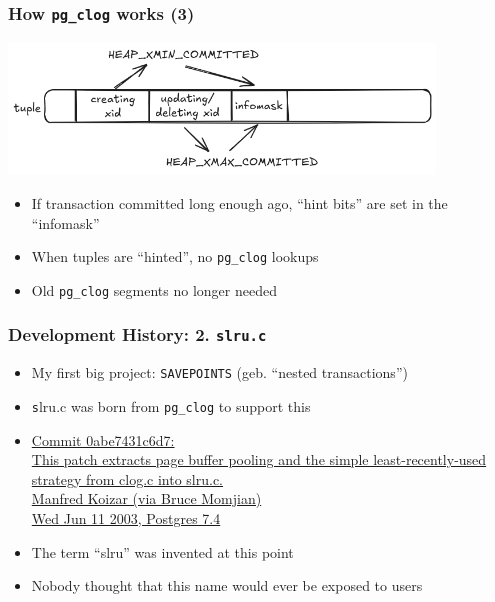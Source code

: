 \begin{frame}
  \frametitle{How \texttt{pg\_clog} works (3)}
  \includegraphics[width=0.85\textwidth]{tuple-hinted.png}
  \begin{itemize}
    \item If transaction committed long enough ago, ``hint bits'' are set
      in the ``infomask''
    \item When tuples are ``hinted'', no \texttt{pg\_clog} lookups 
    \item Old \texttt{pg\_clog} segments no longer needed
  \end{itemize}
\end{frame}

\begin{frame}
  \frametitle{Development History: 2. \texttt{slru.c}}
  \begin{itemize}
    \item My first big project: \texttt{SAVEPOINTS} (geb. ``nested transactions'')
    \item {\texttt slru.c} was born from \texttt{pg\_clog} to support this
    \item {\linksize \href{https://git.postgresql.org/cgit/postgresql.git/commit/?id=0abe7431c6d7a022e7f24a4f145c702900f56174}
      {Commit 0abe7431c6d7: \faExternalLink \\
      This patch extracts page buffer pooling and the simple least-recently-used strategy from clog.c into slru.c. \\
      Manfred Koizar (via Bruce Momjian) \\
      Wed Jun 11 2003, Postgres 7.4}}
    \item The term ``slru'' was invented at this point
    \item Nobody thought that this name would ever be exposed to users
\end{itemize}
\end{frame}


